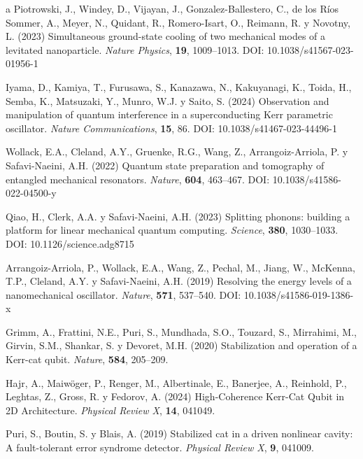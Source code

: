 \documentclass[11pt,a4paper,spanish]{book}
\begin{document}
\begin{thebibliography}{a}
 Piotrowski, J., Windey, D., Vijayan, J., Gonzalez-Ballestero, C., de los Ríos Sommer, A., Meyer, N., Quidant, R., Romero-Isart, O., Reimann, R. y Novotny, L. (2023) Simultaneous ground-state cooling of two mechanical modes of a levitated nanoparticle. \textit{Nature Physics}, \textbf{19}, 1009--1013. DOI: 10.1038/s41567-023-01956-1

 Iyama, D., Kamiya, T., Furusawa, S., Kanazawa, N., Kakuyanagi, K., Toida, H., Semba, K., Matsuzaki, Y., Munro, W.J. y Saito, S. (2024) Observation and manipulation of quantum interference in a superconducting Kerr parametric oscillator. \textit{Nature Communications}, \textbf{15}, 86. DOI: 10.1038/s41467-023-44496-1

 Wollack, E.A., Cleland, A.Y., Gruenke, R.G., Wang, Z., Arrangoiz-Arriola, P. y Safavi-Naeini, A.H. (2022) Quantum state preparation and tomography of entangled mechanical resonators. \textit{Nature}, \textbf{604}, 463--467. DOI: 10.1038/s41586-022-04500-y

 Qiao, H., Clerk, A.A. y Safavi-Naeini, A.H. (2023) Splitting phonons: building a platform for linear mechanical quantum computing. \textit{Science}, \textbf{380}, 1030--1033. DOI: 10.1126/science.adg8715

 Arrangoiz-Arriola, P., Wollack, E.A., Wang, Z., Pechal, M., Jiang, W., McKenna, T.P., Cleland, A.Y. y Safavi-Naeini, A.H. (2019) Resolving the energy levels of a nanomechanical oscillator. \textit{Nature}, \textbf{571}, 537--540. DOI: 10.1038/s41586-019-1386-x

 Grimm, A., Frattini, N.E., Puri, S., Mundhada, S.O., Touzard, S., Mirrahimi, M., Girvin, S.M., Shankar, S. y Devoret, M.H. (2020) Stabilization and operation of a Kerr-cat qubit. \textit{Nature}, \textbf{584}, 205--209.

 Hajr, A., Maiwöger, P., Renger, M., Albertinale, E., Banerjee, A., Reinhold, P., Leghtas, Z., Gross, R. y Fedorov, A. (2024) High-Coherence Kerr-Cat Qubit in 2D Architecture. \textit{Physical Review X}, \textbf{14}, 041049.

 Puri, S., Boutin, S. y Blais, A. (2019) Stabilized cat in a driven nonlinear cavity: A fault-tolerant error syndrome detector. \textit{Physical Review X}, \textbf{9}, 041009.


\end{thebibliography}
\end{document}
